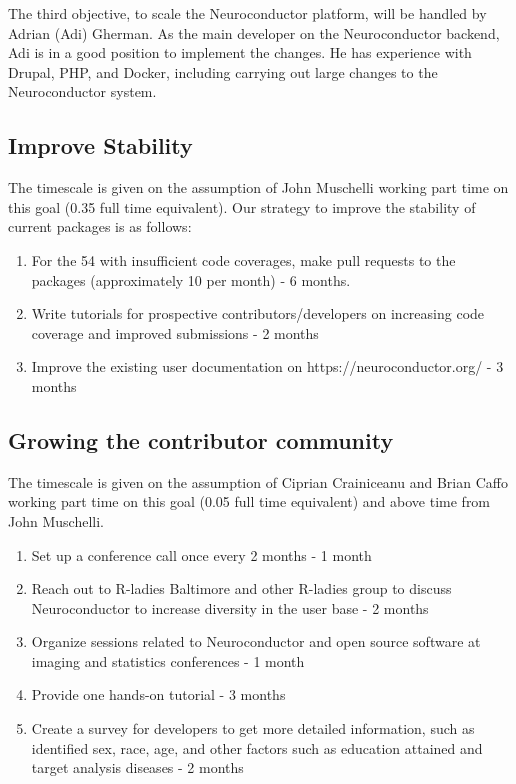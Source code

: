 \documentclass[]{elsarticle} %
\providecommand{\tightlist}{%
  \setlength{\itemsep}{0pt}\setlength{\parskip}{0pt}}
\begin{document}
The third objective, to scale the Neuroconductor platform, will be handled by Adrian (Adi) Gherman. As the main developer on the Neuroconductor backend, Adi is in a good position to implement the changes. He has experience with Drupal, PHP, and Docker, including carrying out large changes to the Neuroconductor system.

\hypertarget{improve-stability}{%
\subsection{Improve Stability}\label{improve-stability}}

The timescale is given on the assumption of John Muschelli working part
time on this goal (0.35 full time equivalent). Our strategy to improve the stability of current packages is as follows:

\begin{enumerate}
\def\labelenumi{\arabic{enumi}.}
\tightlist
\item
  For the 54 with insufficient code coverages, make pull requests to the packages (approximately 10 per month) - 6 months.\\
\item
  Write tutorials for prospective contributors/developers on increasing code coverage and improved submissions - 2 months
\item
  Improve the existing user documentation on https://neuroconductor.org/ - 3 months
\end{enumerate}

\hypertarget{growing-the-contributor-community-1}{%
\subsection{Growing the contributor community}\label{growing-the-contributor-community-1}}

The timescale is given on the assumption of Ciprian Crainiceanu and Brian Caffo working part time on this goal (0.05 full time equivalent) and above time from John Muschelli.

\begin{enumerate}
\def\labelenumi{\arabic{enumi}.}
\tightlist
\item
  Set up a conference call once every 2 months - 1 month
\item
  Reach out to R-ladies Baltimore and other R-ladies group to discuss Neuroconductor to increase diversity in the user base - 2 months
\item
  Organize sessions related to Neuroconductor and open source software at imaging and statistics conferences - 1 month
\item
  Provide one hands-on tutorial - 3 months
\item
  Create a survey for developers to get more detailed information, such as identified sex, race, age, and other factors such as education attained and target analysis diseases - 2 months
\end{enumerate}
\end{document}

